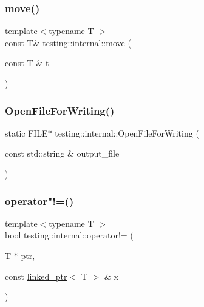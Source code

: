 \mbox{\label{namespacetesting_1_1internal_a0f6d06bf8c3093b9c22bb08723db201e}} 
\subsubsection{\texorpdfstring{move()}{move()}}
{\footnotesize\ttfamily template$<$typename T $>$ \\
const T\& testing\+::internal\+::move (\begin{DoxyParamCaption}\item[{const T \&}]{t }\end{DoxyParamCaption})}

\mbox{\label{namespacetesting_1_1internal_ad2067b047293fd5061a48675982d9ff2}} 
\subsubsection{\texorpdfstring{OpenFileForWriting()}{OpenFileForWriting()}}
{\footnotesize\ttfamily static F\+I\+LE$\ast$ testing\+::internal\+::\+Open\+File\+For\+Writing (\begin{DoxyParamCaption}\item[{const std\+::string \&}]{output\+\_\+file }\end{DoxyParamCaption})\hspace{0.3cm}{\ttfamily [static]}}

\mbox{\label{namespacetesting_1_1internal_a6910869259f8f31825b471e9190fa09a}} 
\subsubsection{\texorpdfstring{operator"!=()}{operator!=()}}
{\footnotesize\ttfamily template$<$typename T $>$ \\
bool testing\+::internal\+::operator!= (\begin{DoxyParamCaption}\item[{T $\ast$}]{ptr,  }\item[{const \mbox{\hyperlink{classtesting_1_1internal_1_1linked__ptr}{linked\+\_\+ptr}}$<$ T $>$ \&}]{x }\end{DoxyParamCaption})\hspace{0.3cm}{\ttfamily [inline]}}

